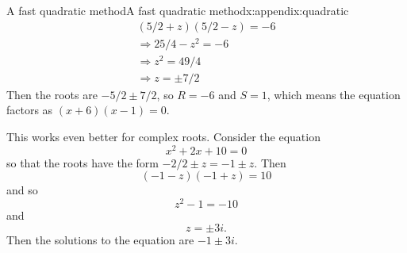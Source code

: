 \documentclass[oneside,10pt,]{book}
\numberwithin{equation}{section}
\numberwithin{equation}{section}
\begin{document}
\begin{appendixptx}{A fast quadratic method}{}{A fast quadratic method}{}{}{x:appendix:quadratic}
\begin{gather*}
(5/2 + z)(5/2 - z) = -6\\
\Rightarrow 25/4 - z^2 = -6 \\
\Rightarrow z^2 = 49/4 \\
\Rightarrow z = \pm 7/2
\end{gather*}
Then the roots are \(-5/2 \pm 7/2\), so \(R = -6\) and \(S = 1\), which means the equation factors as \((x + 6)(x -1) = 0\).%
\par
This works even better for complex roots. Consider the equation%
\begin{equation*}
x^2 + 2x + 10 = 0
\end{equation*}
so that the roots have the form \(-2/2 \pm z = -1 \pm z\). Then%
\begin{equation*}
(-1 - z)(-1 + z) = 10
\end{equation*}
and so%
\begin{equation*}
z^2 - 1 = -10
\end{equation*}
and%
\begin{equation*}
z = \pm 3i\text{.}
\end{equation*}
Then the solutions to the equation are \(-1 \pm 3i\).%
\end{appendixptx}
%
%
\typeout{************************************************}
\typeout{************************************************}
%
\end{document}
